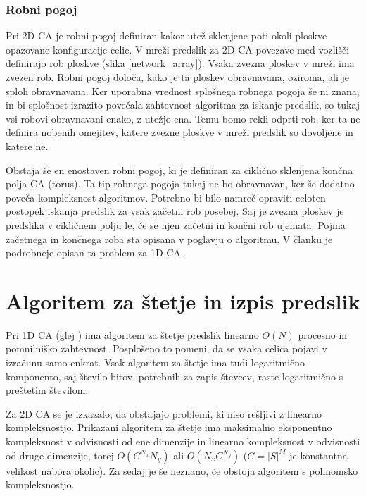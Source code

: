 \documentclass[12pt,a4paper,openany,twoside]{book}
\begin{document}
\subsection{Robni pogoj}

Pri 2D CA je robni pogoj definiran kakor utež sklenjene poti okoli ploskve opazovane konfiguracije celic.
V mreži predslik za 2D CA povezave med vozlišči definirajo rob ploskve (slika \ref{network_array}).
Vsaka zvezna ploskev v mreži ima zvezen rob. Robni pogoj določa, kako je ta ploskev obravnavana,
oziroma, ali je sploh obravnavana.
Ker uporabna vrednost splošnega robnega pogoja še ni znana,
in bi splošnost izrazito povečala zahtevnost algoritma za iskanje predslik,
so tukaj vsi robovi obravnavani enako, z utežjo ena. Temu bomo rekli odprti rob,
ker ta ne definira nobenih omejitev, katere zvezne ploskve v mreži predslik
so dovoljene in katere ne.

Obstaja še en enostaven robni pogoj, ki je definiran za ciklično sklenjena končna polja CA (torus).
Ta tip robnega pogoja tukaj ne bo obravnavan, ker še dodatno poveča kompleksnost algoritmov.
Potrebno bi bilo namreč opraviti celoten postopek iskanja predslik za vsak začetni rob posebej.
Saj je zvezna ploskev je predslika v cikličnem polju le, če se njen začetni in končni rob ujemata.
Pojma začetnega in končnega roba sta opisana v poglavju o algoritmu.
V članku \cite{JerasDobnikar2007} je podrobneje opisan ta problem za 1D CA.




\chapter{Algoritem za štetje in izpis predslik}

Pri 1D CA (glej \cite{JerasDobnikar2007}) ima algoritem za štetje predslik
linearno \(O(N)\) procesno in pomnilniško zahtevnost.
Posplošeno to pomeni, da se vsaka celica pojavi v izračunu samo enkrat.
Vsak algoritem za štetje ima tudi logaritmično komponento,
saj število bitov, potrebnih za zapis števcev, raste logaritmično s preštetim številom.

Za 2D CA se je izkazalo, da obstajajo problemi, ki niso rešljivi z linearno kompleksnostjo.
Prikazani algoritem za štetje ima maksimalno eksponentno kompleksnost
v odvisnosti od ene dimenzije in linearno kompleksnost v odvisnosti od druge dimenzije,
torej \(O(C^{N_x} N_y)\) ali \(O(N_x C^{N_y})\) (\(C=|S|^M\) je konstantna velikost nabora okolic).
Za sedaj je še neznano, če obstoja algoritem s polinomsko kompleksnostjo.
\end{document}
